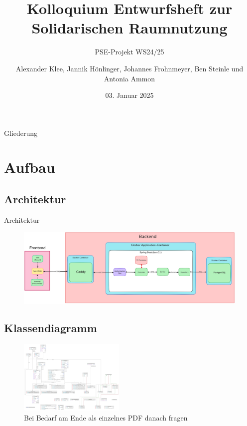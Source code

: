 \documentclass{sdqbeamer}
\title[Solidarische Raumnutzung Entwurfsheft]{Kolloquium Entwurfsheft zur Solidarischen Raumnutzung}
\author[Soli-Gruppe]{Alexander Klee, Jannik Hönlinger, Johannes Frohnmeyer, Ben Steinle und Antonia Ammon }
\subtitle{PSE-Projekt WS24/25}
\date[03.\,01.\,2025]{03. Januar 2025}
\begin{document}
 
\KITtitleframe

\begin{frame}{Gliederung}
\tableofcontents
\end{frame}

\section{Aufbau}

\subsection{Architektur}

\begin{frame}{Architektur}
\begin{figure}
    \centering
    \includegraphics[width=\textwidth]{pictures/figures/architecture}
    \label{fig:architektur}
\end{figure}
\end{frame}

\subsection{Klassendiagramm}

\begin{frame}[plain]
    \begin{figure}
        \centering
        \includegraphics[width=0.45\textwidth]{pictures/figures/classes}
        \caption{Bei Bedarf am Ende als einzelnes PDF danach fragen}
        \label{fig:klassendiagramm}
    \end{figure}
\end{frame}
\end{document}
